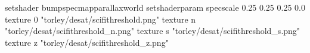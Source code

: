 setshader bumpspecmapparallaxworld
setshaderparam specscale 0.25 0.25 0.25 0.0
texture 0 "torley/desat/scifithreshold.png"
texture n "torley/desat/scifithreshold_n.png"
texture s "torley/desat/scifithreshold_s.png"
texture z "torley/desat/scifithreshold_z.png"

